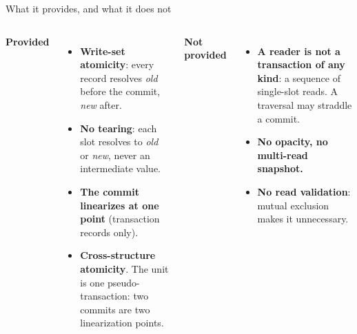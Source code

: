\documentclass[aspectratio=169, 10pt, t, xcolor=table]{beamer}
\begin{document}
\begin{frame}{What it provides, and what it does not}
\begin{columns}[T, onlytextwidth]
  {\large\bfseries\color{accent}Provided\par}
  \vspace{1mm}
  \begin{itemize}\small
  \item \textbf{Write-set atomicity}: every record resolves \emph{old} before
        the commit, \emph{new} after.
  \item \textbf{No tearing}: each slot resolves to \emph{old} or \emph{new},
        never an intermediate value.
  \item \textbf{The commit linearizes at one point} (transaction records
        only).
  \item \textbf{Cross-structure atomicity}. The unit is one
        pseudo-transaction: two commits are two linearization points.
  \end{itemize}
  {\large\bfseries\color{old}Not provided\par}
  \vspace{1mm}
  \begin{itemize}\small
  \item \textbf{A reader is not a transaction of any kind}: a sequence of
        single-slot reads. A traversal may straddle a commit.
  \item \textbf{No opacity, no multi-read snapshot.}
  \item \textbf{No read validation}: mutual exclusion makes it
        unnecessary.
  \end{itemize}
\end{columns}
\label{fr:provides}
\end{frame}
\end{document}
